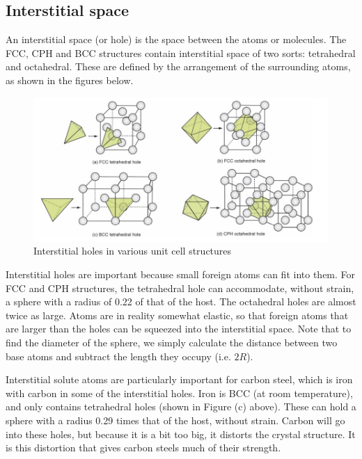 \documentclass{article}
\begin{document}
\newpage

\subsection{Interstitial space}

\begin{definition}
    An interstitial space (or hole) is the space between the atoms or molecules. The FCC, CPH and BCC structures contain interstitial space of two sorts: tetrahedral and octahedral. These are defined by the arrangement of the surrounding atoms, as shown in the figures below.
\end{definition}

\begin{figure}[h]
    \centering
    \includegraphics[width = \textwidth]{images/mat8.png}
    \caption{Interstitial holes in various unit cell structures}
    \label{fig:enter-label}
\end{figure}

Interstitial holes are important because small foreign atoms can fit into them. For FCC and CPH structures, the tetrahedral hole can accommodate, without strain, a sphere with a radius of 0.22 of that of the host. The octahedral holes are almost twice as large. Atoms are in reality somewhat elastic, so that foreign atoms that are larger than the holes can be squeezed into the interstitial space. Note that to find the diameter of the sphere, we simply calculate the distance between two base atoms and subtract the length they occupy (i.e. $2R$).

Interstitial solute atoms are particularly important for carbon steel, which is iron with carbon in some of the interstitial holes. Iron is BCC (at room temperature), and only contains tetrahedral holes (shown in Figure (c) above). These can hold a sphere with a radius 0.29 times that of the host, without strain. Carbon will go into these holes, but because it is a bit too big, it distorts the crystal structure. It is this distortion that gives carbon steels much of their strength. 
\end{document}
